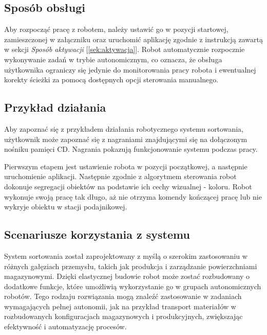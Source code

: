 \subsection{Sposób obsługi}
Aby rozpocząć pracę z robotem, należy ustawić go w pozycji startowej, zamieszczonej w załączniku oraz uruchomić aplikację zgodnie z instrukcją zawartą w sekcji \textit{Sposób aktywacji} [\ref{sek:aktywacja}]. Robot automatycznie rozpocznie wykonywanie zadań w trybie autonomicznym, co oznacza, że obsługa użytkownika ograniczy się jedynie do monitorowania pracy robota i ewentualnej korekty ścieżki za pomocą dostępnych opcji sterowania manualnego.

\subsection{Przykład działania}
Aby zapoznać się z przykładem działania robotycznego systemu sortowania, użytkownik może zapoznać się z nagraniami znajdującymi się na dołączonym nośniku pamięci CD. Nagrania pokazują funkcjonowanie systemu podczas pracy.

Pierwszym etapem jest ustawienie robota w pozycji początkowej, a następnie uruchomienie aplikacji. Następnie zgodnie z algorytmem sterowania robot dokonuje segregacji obiektów na podstawie ich cechy wizualnej - koloru. Robot wykonuje swoją pracę tak długo, aż nie otrzyma komendy kończącej pracę lub nie wykryje obiektu w stacji podajnikowej. 

\subsection{Scenariusze korzystania z systemu}
System sortowania został zaprojektowany z myślą o szerokim zastosowaniu w różnych gałęziach przemysłu, takich jak produkcja i zarządzanie powierzchniami magazynowymi. Dzięki elastycznej budowie robot może zostać rozbudowany o dodatkowe funkcje, które umożliwią wykorzystanie go w grupach autonomicznych robotów. Tego rodzaju rozwiązania mogą znaleźć zastosowanie w zadaniach wymagających pełnej autonomii, jak na przykład transport materiałów w rozbudowanych konfiguracjach magazynowych i produkcyjnych, zwiększając efektywność i automatyzację procesów.




